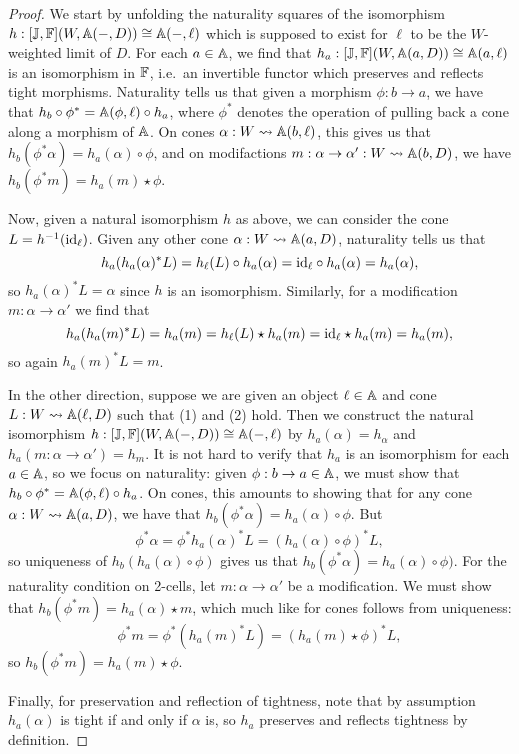 \documentclass[../thesis.tex]{subfiles}
\begin{document}
  \begin{proof}
    We start by unfolding the naturality squares of the isomorphism $h : [{\mathbb{J}},{\mathbb{F}}](W,{\mathbb{A}}(-,D)) \cong {\mathbb{A}}(-,\ell)$
    which is supposed to exist for $\ell$ to be the $W$-weighted limit of $D$. For each $a \in {\mathbb{A}}$, we find that
    $h_a : [{\mathbb{J}},{\mathbb{F}}](W,{\mathbb{A}}(a,D)) \cong {\mathbb{A}}(a,\ell)$ is an isomorphism in ${\mathbb{F}}$, i.e.\ an invertible functor which
    preserves and reflects tight morphisms. Naturality tells us that given a morphism $\phi : b \to a$, we have
    that $h_b \circ \phi^* = {\mathbb{A}}(\phi,\ell) \circ h_a$, where $\phi^*$ denotes the operation of pulling back a 
    cone along a morphism of ${\mathbb{A}}$. On cones $\alpha : W \rightsquigarrow {\mathbb{A}}(b,\ell)$, this gives us that $h_b(\phi^*
    \alpha) = h_a(\alpha) \circ \phi$, and on modifactions $m : \alpha \to \alpha' : W \rightsquigarrow {\mathbb{A}}(b,D)$, we
    have $h_b(\phi^*m) = h_a(m) \star \phi$.
    
    Now, given a natural isomorphism $h$ as above, we can consider the cone $L = h^{-1}({\mathrm{id}}_\ell)$. Given any
    other cone $\alpha : W \rightsquigarrow {\mathbb{A}}(a,D)$, naturality tells us that
    \[h_a(h_a(\alpha)^*L) = h_\ell(L) \circ h_a(\alpha) = {\mathrm{id}}_\ell \circ h_a(\alpha) = h_a(\alpha),\]
    so $h_a(\alpha)^*L = \alpha$ since $h$ is an isomorphism. Similarly, for a modification $m : \alpha \to
    \alpha'$ we find that
    \[h_a(h_a(m)^*L) = h_a(m) = h_\ell(L) \star h_a(m) = {\mathrm{id}}_\ell \star h_a(m) = h_a(m),\]
    so again $h_a(m)^*L = m$.


    In the other direction, suppose we are given an object $\ell \in {\mathbb{A}}$ and cone $L : W \rightsquigarrow {\mathbb{A}}(\ell,D)$
    such that (1) and (2) hold. Then we construct the natural isomorphism $h : [{\mathbb{J}},{\mathbb{F}}](W,{\mathbb{A}}(-,D)) \cong
    {\mathbb{A}}(-,\ell)$ by $h_a(\alpha) = h_\alpha$ and $h_a(m : \alpha \to \alpha') = h_m$. It is not hard to verify
    that $h_a$ is an isomorphism for each $a \in {\mathbb{A}}$, so we focus on naturality: given $\phi : b \to a \in
    {\mathbb{A}}$, we must show that $h_b \circ \phi^* = {\mathbb{A}}(\phi,\ell) \circ h_a$. On cones, this amounts to showing
    that for any cone $\alpha : W \rightsquigarrow {\mathbb{A}}(a,D)$, we have that $h_b(\phi^*\alpha) = h_a(\alpha) \circ \phi$.
    But
    \[
      \phi^*\alpha = \phi^*h_a(\alpha)^*L = (h_a(\alpha) \circ \phi)^*L,
    \]
    so uniqueness of $h_b(h_a(\alpha) \circ \phi)$ gives us that $h_b(\phi^*\alpha) = h_a(\alpha) \circ \phi)$.
    For the naturality condition on 2-cells, let $m : \alpha \to \alpha'$ be a modification. We must show that
    $h_b(\phi^*m) = h_a(\alpha) \star m$, which much like for cones follows from uniqueness:
    \[\phi^*m = \phi^*(h_a(m)^*L) = (h_a(m)\star\phi)^*L,\]
    so $h_b(\phi^*m) = h_a(m)\star\phi$.

    Finally, for preservation and reflection of tightness, note that by assumption $h_a(\alpha)$ is tight if and
    only if $\alpha$ is, so $h_a$ preserves and reflects tightness by definition.
  \end{proof}
\end{document}
